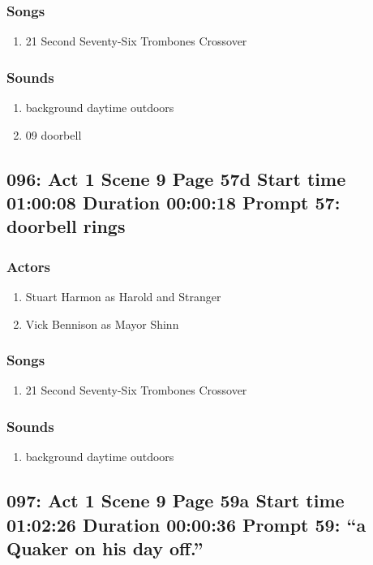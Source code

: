 \subsubsection{Songs}
\begin{enumerate}
\item 21 Second Seventy-Six Trombones Crossover
\end{enumerate}\subsubsection{Sounds}
\begin{enumerate}
\item background daytime outdoors
\item 09 doorbell
\end{enumerate}
\subsection{096: Act 1 Scene 9 Page 57d Start time 01:00:08 Duration 00:00:18 Prompt 57: doorbell rings}

\subsubsection{Actors}
\begin{enumerate}
\item Stuart Harmon as Harold and Stranger
\item Vick Bennison as Mayor Shinn
\end{enumerate}

\subsubsection{Songs}
\begin{enumerate}
\item 21 Second Seventy-Six Trombones Crossover
\end{enumerate}\subsubsection{Sounds}
\begin{enumerate}
\item background daytime outdoors
\end{enumerate}
\subsection{097: Act 1 Scene 9 Page 59a Start time 01:02:26 Duration 00:00:36 Prompt 59: ``a Quaker on his day off.''}
